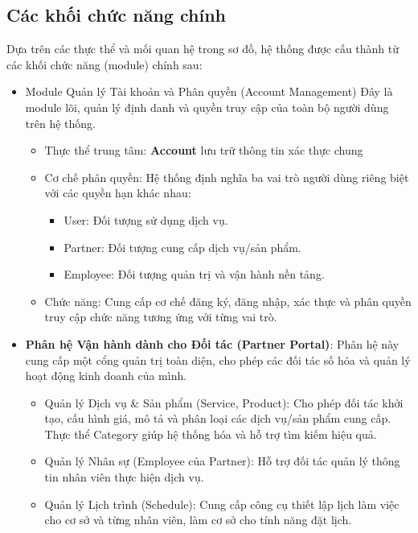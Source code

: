 \subsection{Các khối chức năng chính}
 Dựa trên các thực thể và mối quan hệ trong sơ đồ, hệ thống được cấu thành từ các khối chức năng (module) chính sau:
 \begin{itemize}
            \item Module Quản lý Tài khoản và Phân quyền (Account Management)
            Đây là module lõi, quản lý định danh và quyền truy cập của toàn bộ người dùng trên hệ thống.
            \begin{itemize}
                \item Thực thể trung tâm: \textbf{Account} lưu trữ thông tin xác thực chung
                \item Cơ chế phân quyền: Hệ thống định nghĩa ba vai trò người dùng riêng biệt với các quyền hạn khác nhau:
                \begin{itemize}
                    \item User: Đối tượng sử dụng dịch vụ.
                    \item Partner: Đối tượng cung cấp dịch vụ/sản phẩm.
                    \item Employee: Đối tượng quản trị và vận hành nền tảng.
                \end{itemize}
                \item Chức năng: Cung cấp cơ chế đăng ký, đăng nhập, xác thực và phân quyền truy cập chức năng tương ứng với từng vai trò.
            \end{itemize}
            \item \textbf{Phân hệ Vận hành dành cho Đối tác (Partner Portal)}: 
            Phân hệ này cung cấp một cổng quản trị toàn diện, cho phép các đối tác số hóa và quản lý hoạt động kinh doanh của mình.
            \begin{itemize}
                \item Quản lý Dịch vụ \& Sản phẩm (Service, Product): Cho phép đối tác khởi tạo, cấu hình giá, mô tả và phân loại các dịch vụ/sản phẩm cung cấp. Thực thể Category giúp hệ thống hóa và hỗ trợ tìm kiếm hiệu quả.
                \item Quản lý Nhân sự (Employee của Partner): Hỗ trợ đối tác quản lý thông tin nhân viên thực hiện dịch vụ.
                \item Quản lý Lịch trình (Schedule): Cung cấp công cụ thiết lập lịch làm việc cho cơ sở và từng nhân viên, làm cơ sở cho tính năng đặt lịch.

\end{itemize}
\end{itemize}
